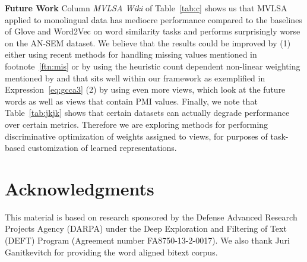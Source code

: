 \documentclass[11pt]{article}
\begin{document}
\noindent\textbf{Future Work} Column \emph{MVLSA Wiki} of
Table~\ref{tab:c} shows us that MVLSA applied to monolingual data has
 mediocre performance  compared to the baselines of Glove and
Word2Vec on word similarity tasks and performs surprisingly worse on
the AN-SEM dataset. We believe that the results could be improved by (1)
either using recent methods for handling missing values
mentioned in footnote~\ref{ftn:mis} or by using the heuristic count dependent
non-linear weighting mentioned by 
and that sits well within our framework as exemplified in Expression~\ref{eq:gcca3}
 (2) by using even more views, which
look at the future words as well as views that contain PMI values. 
Finally, we note that Table~\ref{tab:jkjk} shows that certain datasets can
actually degrade performance over certain metrics. Therefore we are
exploring methods for performing discriminative optimization of weights
assigned to views, for purposes of task-based customization of learned representations.


\section*{Acknowledgments}
This material is based on research sponsored by the Defense Advanced Research
Projects Agency (DARPA) under the Deep Exploration and
Filtering of Text (DEFT) Program (Agreement number
FA8750-13-2-0017). We also thank Juri Ganitkevitch for 
providing the word aligned bitext corpus.



\end{document}
